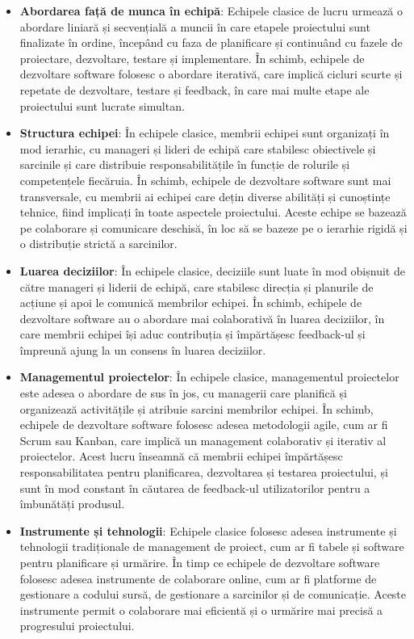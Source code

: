 \documentclass[a4paper, 12pt]{article}
\begin{document}
\begin {itemize}

	\item \textbf{Abordarea față de munca în echipă}: Echipele clasice de lucru urmează o abordare liniară și secvențială a muncii în care etapele proiectului sunt finalizate în ordine, începând cu faza de planificare și continuând cu fazele de proiectare, dezvoltare, testare și implementare. În schimb, echipele de dezvoltare software folosesc o abordare iterativă, care implică cicluri scurte și repetate de dezvoltare, testare și feedback, în care mai multe etape ale proiectului sunt lucrate simultan.


	\item \textbf{Structura echipei}: În echipele clasice, membrii echipei sunt organizați în mod ierarhic, cu manageri și lideri de echipă care stabilesc obiectivele și sarcinile și care distribuie responsabilitățile în funcție de rolurile și competențele fiecăruia. În schimb, echipele de dezvoltare software sunt mai transversale, cu membrii ai echipei care dețin diverse abilități și cunoștințe tehnice, fiind implicați în toate aspectele proiectului. Aceste echipe se bazează pe colaborare și comunicare deschisă, în loc să se bazeze pe o ierarhie rigidă și o distribuție strictă a sarcinilor.

	\item \textbf{Luarea deciziilor}: În echipele clasice, deciziile sunt luate în mod obișnuit de către manageri și liderii de echipă, care stabilesc direcția și planurile de acțiune și apoi le comunică membrilor echipei. În schimb, echipele de dezvoltare software au o abordare mai colaborativă în luarea deciziilor, în care membrii echipei își aduc contribuția și împărtășesc feedback-ul și împreună ajung la un consens în luarea deciziilor.

	\item\textbf{Managementul proiectelor}: În echipele clasice, managementul proiectelor este adesea o abordare de sus în jos, cu managerii care planifică și organizează activitățile și atribuie sarcini membrilor echipei. În schimb, echipele de dezvoltare software folosesc adesea metodologii agile, cum ar fi Scrum sau Kanban, care implică un management colaborativ și iterativ al proiectelor. Acest lucru înseamnă că membrii echipei împărtășesc responsabilitatea pentru planificarea, dezvoltarea și testarea proiectului, și sunt în mod constant în căutarea de feedback-ul utilizatorilor pentru a îmbunătăți produsul.

	\item \textbf{ Instrumente și tehnologii}: Echipele clasice folosesc adesea instrumente și tehnologii tradiționale de management de proiect, cum ar fi tabele și software pentru planificare și urmărire. În timp ce echipele de dezvoltare software folosesc adesea instrumente de colaborare online, cum ar fi platforme de gestionare a codului sursă, de gestionare a sarcinilor și de comunicație. Aceste instrumente permit o colaborare mai eficientă și o urmărire mai precisă a progresului proiectului.


\end{itemize}
\end{document}
